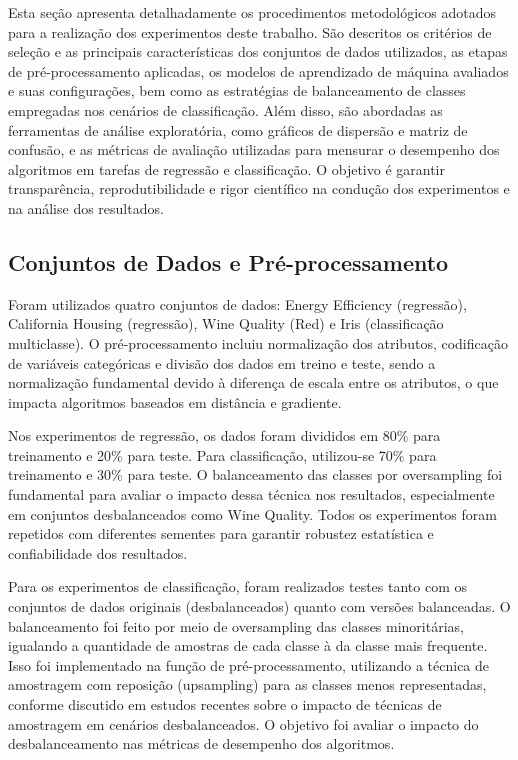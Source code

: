Esta seção apresenta detalhadamente os procedimentos metodológicos adotados para a realização dos experimentos deste trabalho. São descritos os critérios de seleção e as principais características dos conjuntos de dados utilizados, as etapas de pré-processamento aplicadas, os modelos de aprendizado de máquina avaliados e suas configurações, bem como as estratégias de balanceamento de classes empregadas nos cenários de classificação. Além disso, são abordadas as ferramentas de análise exploratória, como gráficos de dispersão e matriz de confusão, e as métricas de avaliação utilizadas para mensurar o desempenho dos algoritmos em tarefas de regressão e classificação. O objetivo é garantir transparência, reprodutibilidade e rigor científico na condução dos experimentos e na análise dos resultados.

\subsection{Conjuntos de Dados e Pré-processamento}

Foram utilizados quatro conjuntos de dados: Energy Efficiency (regressão)\cite{energyefficiency}, California Housing (regressão)\cite{californiahousing}, Wine Quality (Red)\cite{winequality} e Iris (classificação multiclasse)\cite{iris}. O pré-processamento incluiu normalização dos atributos, codificação de variáveis categóricas e divisão dos dados em treino e teste, sendo a normalização fundamental devido à diferença de escala entre os atributos, o que impacta algoritmos baseados em distância e gradiente.

Nos experimentos de regressão, os dados foram divididos em 80\% para treinamento e 20\% para teste. Para classificação, utilizou-se 70\% para treinamento e 30\% para teste. O balanceamento das classes por oversampling foi fundamental para avaliar o impacto dessa técnica nos resultados, especialmente em conjuntos desbalanceados como Wine Quality. Todos os experimentos foram repetidos com diferentes sementes para garantir robustez estatística e confiabilidade dos resultados.

Para os experimentos de classificação, foram realizados testes tanto com os conjuntos de dados originais (desbalanceados) quanto com versões balanceadas. O balanceamento foi feito por meio de oversampling das classes minoritárias, igualando a quantidade de amostras de cada classe à da classe mais frequente. Isso foi implementado na função de pré-processamento, utilizando a técnica de amostragem com reposição (upsampling) para as classes menos representadas, conforme discutido em estudos recentes sobre o impacto de técnicas de amostragem em cenários desbalanceados\cite{dantas2024}. O objetivo foi avaliar o impacto do desbalanceamento nas métricas de desempenho dos algoritmos.

